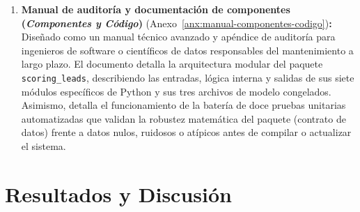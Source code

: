 \begin{enumerate}
    \item \textbf{Manual de auditoría y documentación de componentes (\emph{Componentes y Código})} (Anexo~\ref{anx:manual-componentes-codigo})\textbf{:} Diseñado como un manual técnico avanzado y apéndice de auditoría para ingenieros de software o científicos de datos responsables del mantenimiento a largo plazo. El documento detalla la arquitectura modular del paquete \texttt{scoring\_leads}, describiendo las entradas, lógica interna y salidas de sus siete módulos específicos de Python y sus tres archivos de modelo congelados. Asimismo, detalla el funcionamiento de la batería de doce pruebas unitarias automatizadas que validan la robustez matemática del paquete (contrato de datos) frente a datos nulos, ruidosos o atípicos antes de compilar o actualizar el sistema.
\end{enumerate}

%

%

\chapter{Resultados y Discusión}
\label{chap:resultados}

